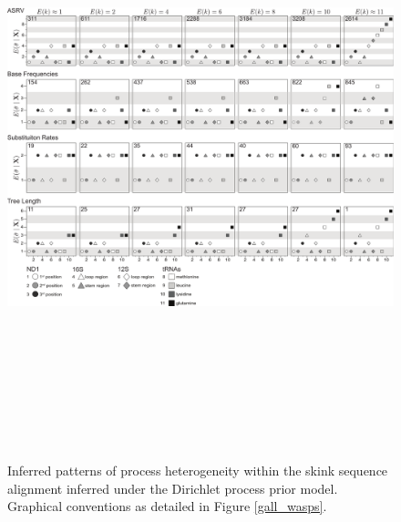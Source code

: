 \documentclass[11pt]{article}
\begin{document}
\newpage

\begin{figure}[h] 
\centering 
\includegraphics[angle=90, height=175mm]{figure_3.pdf} 
\caption{Inferred patterns of process heterogeneity within the skink sequence alignment inferred under the Dirichlet process prior model.  Graphical conventions as detailed in Figure \ref{gall_wasps}.}
\label{skinks}
\end{figure} 

\newpage
\end{document}
